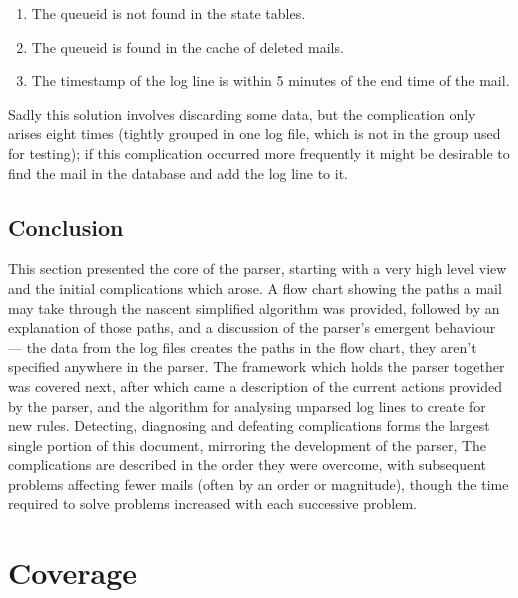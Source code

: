 \documentclass[a4paper,12pt,draft]{article}
\begin{document}
\begin{enumerate}

    \item The queueid is not found in the state tables. 
        
    \item The queueid is found in the cache of deleted mails.
        
    \item The timestamp of the log line is within 5 minutes of the end time
        of the mail.

\end{enumerate}

Sadly this solution involves discarding some data, but the complication
only arises eight times (tightly grouped in one log file, which is not in
the group used for testing); if this complication occurred more frequently
it might be desirable to find the mail in the database and add the log
line to it.

\subsection{Conclusion}

This section presented the core of the parser, starting with a very high
level view and the initial complications which arose.  A flow chart showing
the paths a mail may take through the nascent simplified algorithm was
provided, followed by an explanation of those paths, and a discussion of
the parser's emergent behaviour --- the data from the log files creates the
paths in the flow chart, they aren't specified anywhere in the parser.  The
framework which holds the parser together was covered next, after which
came a description of the current actions provided by the parser, and the
algorithm for analysing unparsed log lines to create \regexes{} for new
rules.  Detecting, diagnosing and defeating complications forms the largest
single portion of this document, mirroring the development of the parser,
The complications are described in the order they were overcome, with
subsequent problems affecting fewer mails (often by an order or magnitude),
though the time required to solve problems increased with each successive
problem.


\section{Coverage}

\label{parsing coverage}
\end{document}
